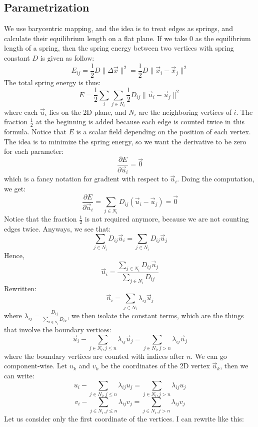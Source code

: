 \documentclass{article}
\begin{document}
\subsection{Parametrization}
We use barycentric mapping, and the idea is to treat edges as springs, and calculate their equilibrium length on a flat plane. If we take $0$ as the equilibrium length of a spring, then the spring energy between two vertices with spring constant $D$ is given as follow:
$$E_{ij} = \frac{1}{2} D \lVert \Delta \vec{x} \rVert ^2 = \frac{1}{2} D \lVert \vec{x}_i - \vec{x}_j \rVert ^2$$
The total spring energy is thus:
$$E = \frac{1}{2} \sum_{i} \sum_{j \in N_i} \frac{1}{2} D_{ij} \lVert \vec{u}_i - \vec{u}_j \rVert ^2$$
where each $\vec{u}_i$ lies on the 2D plane, and $N_i$ are the neighboring vertices of $i$. The fraction $\frac{1}{2}$ at the beginning is added because each edge is counted twice in this formula. Notice that $E$ is a scalar field depending on the position of each vertex. The idea is to minimize the spring energy, so we want the derivative to be zero for each parameter:
$$\frac{\partial E}{\partial \vec{u}_i} = \vec{0}$$
which is a fancy notation for gradient with respect to $\vec{u}_i$. Doing the computation, we get:
$$\frac{\partial E}{\partial \vec{u}_i} = \sum_{j \in N_i} D_{ij} (\vec{u}_i - \vec{u}_j) = \vec{0}$$
Notice that the fraction $\frac{1}{2}$ is not required anymore, because we are not counting edges twice. Anyways, we see that:
$$\sum_{j \in N_i} D_{ij} \vec{u}_i = \sum_{j \in N_i} D_{ij} \vec{u}_j$$
Hence,
$$\vec{u}_i = \frac{\sum_{j \in N_i} D_{ij} \vec{u}_j}{\sum_{j \in N_i} D_{ij}}$$
Rewritten:
$$\vec{u}_i = \sum_{j \in N_i} \lambda_{ij} \vec{u}_j$$
where $\lambda_{ij} = \frac{D_{ij}}{\sum_{k \in N_i} D_{ik}}$, we then isolate the constant terms, which are the things that involve the boundary vertices:
$$\vec{u}_i - \sum_{j \in N_i, j \leq n} \lambda_{ij} \vec{u}_j = \sum_{j \in N_i, j > n} \lambda_{ij} \vec{u}_j$$
where the boundary vertices are counted with indices after $n$. We can go component-wise. Let $u_k$ and $v_k$ be the coordinates of the 2D vertex $\vec{u}_k$, then we can write:
$$u_i - \sum_{j \in N_i, j \leq n} \lambda_{ij} u_j = \sum_{j \in N_i, j > n} \lambda_{ij} u_j$$
$$v_i - \sum_{j \in N_i, j \leq n} \lambda_{ij} v_j = \sum_{j \in N_i, j > n} \lambda_{ij} v_j$$
Let us consider only the first coordinate of the vertices. I can rewrite like this:
\end{document}
